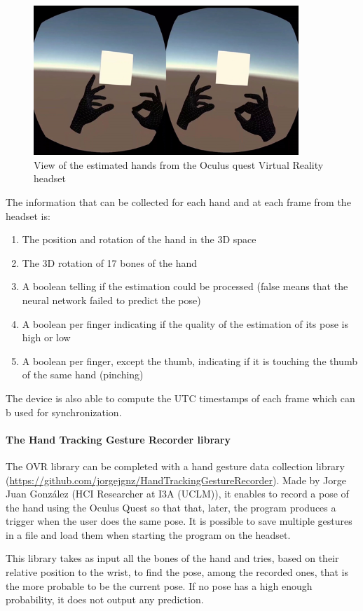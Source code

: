 \documentclass{article}
\begin{document}
\begin{figure}[h]
	\centering
	\includegraphics[width=10cm]{images/questView.png}
	\caption{View of the estimated hands from the Oculus quest Virtual Reality headset}
	\label{fig:cyberGlove3}
\end{figure}

The information that can be collected for each hand and at each frame from the headset is:
\begin{enumerate}
	\item The position and rotation of the hand in the 3D space
	\item The 3D rotation of 17 bones of the hand
	\item A boolean telling if the estimation could be processed (false means that the neural network failed to predict the pose)
	\item A boolean per finger indicating if the quality of the estimation of its pose is high or low
	\item A boolean per finger, except the thumb, indicating if it is touching the thumb of the same hand (pinching)
\end{enumerate}
The device is also able to compute the UTC timestamps of each frame which can b used for synchronization.

\paragraph{The Hand Tracking Gesture Recorder library}

The OVR library can be completed with a hand gesture data collection library (\url{https://github.com/jorgejgnz/HandTrackingGestureRecorder}). Made by Jorge Juan González (HCI Researcher at I3A (UCLM)), it enables to record a pose of the hand using the Oculus Quest so that that, later, the program produces a trigger when the user does the same pose. It is possible to save multiple gestures in a file and load them when starting the program on the headset.

This library takes as input all the bones of the hand and tries, based on their relative position to the wrist, to find the pose, among the recorded ones, that is the more probable to be the current pose. If no pose has a high enough probability, it does not output any prediction.
\end{document}
